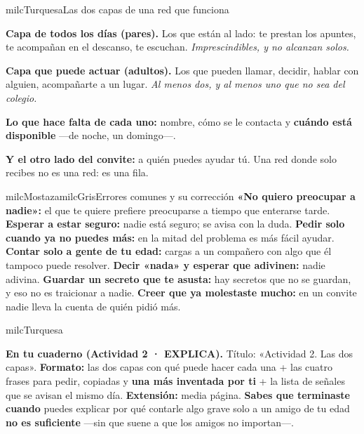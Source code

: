 \documentclass[11pt,letterpaper]{article}
\begin{document}
\begin{drawbox}{milcTurquesa}{Las dos capas de una red que funciona}
\begin{pasoslista}
\item \textbf{Capa de todos los días (pares).} Los que están al lado: te prestan los apuntes, te acompañan en el descanso, te escuchan. \emph{Imprescindibles, y no alcanzan solos.}
\item \textbf{Capa que puede actuar (adultos).} Los que pueden llamar, decidir, hablar con alguien, acompañarte a un lugar. \emph{Al menos dos, y al menos uno que no sea del colegio.}
\item \textbf{Lo que hace falta de cada uno:} nombre, cómo se le contacta y \textbf{cuándo está disponible} ---de noche, un domingo---.
\item \textbf{Y el otro lado del convite:} a quién puedes ayudar tú. Una red donde solo recibes no es una red: es una fila.
\end{pasoslista}
\end{drawbox}

\begin{softbox}{milcMostaza}{milcGris}{Errores comunes y su corrección}
\textbf{«No quiero preocupar a nadie»:} el que te quiere prefiere preocuparse a tiempo que enterarse tarde. \textbf{Esperar a estar seguro:} nadie está seguro; se avisa con la duda. \textbf{Pedir solo cuando ya no puedes más:} en la mitad del problema es más fácil ayudar. \textbf{Contar solo a gente de tu edad:} cargas a un compañero con algo que él tampoco puede resolver. \textbf{Decir «nada» y esperar que adivinen:} nadie adivina. \textbf{Guardar un secreto que te asusta:} hay secretos que no se guardan, y eso no es traicionar a nadie. \textbf{Creer que ya molestaste mucho:} en un convite nadie lleva la cuenta de quién pidió más.
\end{softbox}

\begin{infoband}{milcTurquesa}


\textbf{En tu cuaderno (Actividad 2 · EXPLICA).} Título: «Actividad 2. Las dos capas». \textbf{Formato:} las dos capas con qué puede hacer cada una + las cuatro frases para pedir, copiadas y \textbf{una más inventada por ti} + la lista de señales que se avisan el mismo día. \textbf{Extensión:} media página. \textbf{Sabes que terminaste cuando} puedes explicar por qué contarle algo grave solo a un amigo de tu edad \textbf{no es suficiente} ---sin que suene a que los amigos no importan---.
\end{infoband}
\end{document}
